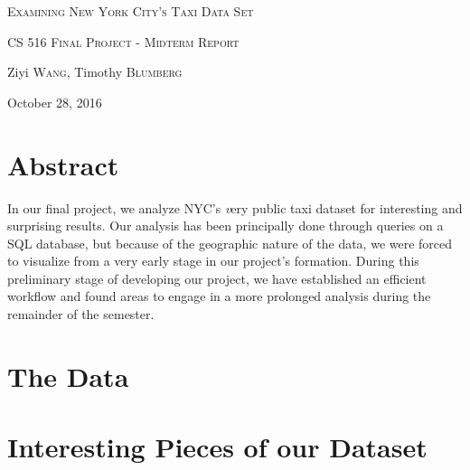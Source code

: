 \documentclass{article}
\begin{document}
\begin{center}
	{\scshape \LARGE Examining New York City's Taxi Data Set \par}
	\vspace{0.3cm}
	{\scshape \large CS 516 Final Project - Midterm Report\par}
	\vspace{0.3cm}
	{ Ziyi \textsc{Wang}, Timothy \textsc{Blumberg}\par}
	\vspace{0.3cm}
	{ October 28, 2016\par}
	\vspace{1.5cm}
\end{center}



\section*{Abstract}
In our final project, we analyze NYC's {\textit very} public taxi dataset for interesting and surprising results. Our analysis has been principally done through queries on a SQL database, but because of the geographic nature of the data, we were forced to visualize from a very early stage in our project's formation. During this preliminary stage of developing our project, we have established an efficient workflow and found areas to engage in a more prolonged analysis during the remainder of the semester. \cite{einstein}

\section{The Data}

\section{Interesting Pieces of our Dataset}

\vfill

\medskip


\end{document}
